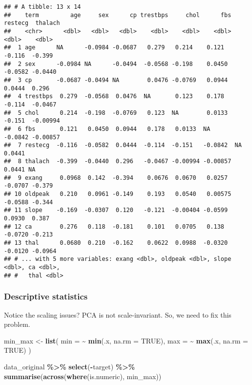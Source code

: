 \documentclass[
]{book}
\newenvironment{Shaded}{\begin{snugshade}}{\end{snugshade}}
\newcommand{\DataTypeTok}[1]{\textcolor[rgb]{0.13,0.29,0.53}{#1}}
\newcommand{\KeywordTok}[1]{\textcolor[rgb]{0.13,0.29,0.53}{\textbf{#1}}}
\newcommand{\NormalTok}[1]{#1}
\newcommand{\OperatorTok}[1]{\textcolor[rgb]{0.81,0.36,0.00}{\textbf{#1}}}
\newcommand{\OtherTok}[1]{\textcolor[rgb]{0.56,0.35,0.01}{#1}}
\newcommand{\StringTok}[1]{\textcolor[rgb]{0.31,0.60,0.02}{#1}}
\begin{document}
\begin{verbatim}
## # A tibble: 13 x 14
##    term         age     sex      cp trestbps     chol      fbs restecg  thalach
##    <chr>      <dbl>   <dbl>   <dbl>    <dbl>    <dbl>    <dbl>   <dbl>    <dbl>
##  1 age      NA      -0.0984 -0.0687   0.279   0.214    0.121   -0.116  -0.399  
##  2 sex      -0.0984 NA      -0.0494  -0.0568 -0.198    0.0450  -0.0582 -0.0440 
##  3 cp       -0.0687 -0.0494 NA        0.0476 -0.0769   0.0944   0.0444  0.296  
##  4 trestbps  0.279  -0.0568  0.0476  NA       0.123    0.178   -0.114  -0.0467 
##  5 chol      0.214  -0.198  -0.0769   0.123  NA        0.0133  -0.151  -0.00994
##  6 fbs       0.121   0.0450  0.0944   0.178   0.0133  NA       -0.0842 -0.00857
##  7 restecg  -0.116  -0.0582  0.0444  -0.114  -0.151   -0.0842  NA       0.0441 
##  8 thalach  -0.399  -0.0440  0.296   -0.0467 -0.00994 -0.00857  0.0441 NA      
##  9 exang     0.0968  0.142  -0.394    0.0676  0.0670   0.0257  -0.0707 -0.379  
## 10 oldpeak   0.210   0.0961 -0.149    0.193   0.0540   0.00575 -0.0588 -0.344  
## 11 slope    -0.169  -0.0307  0.120   -0.121  -0.00404 -0.0599   0.0930  0.387  
## 12 ca        0.276   0.118  -0.181    0.101   0.0705   0.138   -0.0720 -0.213  
## 13 thal      0.0680  0.210  -0.162    0.0622  0.0988  -0.0320  -0.0120 -0.0964 
## # ... with 5 more variables: exang <dbl>, oldpeak <dbl>, slope <dbl>, ca <dbl>,
## #   thal <dbl>
\end{verbatim}

\hypertarget{descriptive-statistics}{%
\subsubsection{Descriptive statistics}\label{descriptive-statistics}}

Notice the scaling issues? PCA is not scale-invariant. So, we need to fix this problem.

\begin{Shaded}
\begin{Highlighting}[]
\NormalTok{min\_max \textless{}{-}}\StringTok{ }\KeywordTok{list}\NormalTok{(}
  \DataTypeTok{min =} \OperatorTok{\textasciitilde{}}\StringTok{ }\KeywordTok{min}\NormalTok{(.x, }\DataTypeTok{na.rm =} \OtherTok{TRUE}\NormalTok{),}
  \DataTypeTok{max =} \OperatorTok{\textasciitilde{}}\StringTok{ }\KeywordTok{max}\NormalTok{(.x, }\DataTypeTok{na.rm =} \OtherTok{TRUE}\NormalTok{)}
\NormalTok{)}

\NormalTok{data\_original }\OperatorTok{\%\textgreater{}\%}
\StringTok{  }\KeywordTok{select}\NormalTok{(}\OperatorTok{{-}}\NormalTok{target) }\OperatorTok{\%\textgreater{}\%}
\StringTok{  }\KeywordTok{summarise}\NormalTok{(}\KeywordTok{across}\NormalTok{(}\KeywordTok{where}\NormalTok{(is.numeric), min\_max))}
\end{Highlighting}
\end{Shaded}
\end{document}
